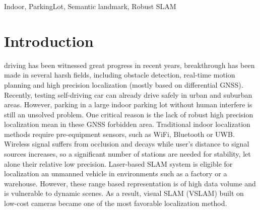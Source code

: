 \documentclass[journal]{IEEEtran}
\begin{document}
\begin{IEEEkeywords}
Indoor, ParkingLot, Semantic landmark, Robust SLAM
\end{IEEEkeywords}






%
\IEEEpeerreviewmaketitle



\section{Introduction}
% 
% 
% 
% 


 driving has been witnessed great progress in recent years, breakthrough has been made in several harsh fields, including obstacle detection, real-time motion planning and high precision localization (mostly based on differential GNSS).
Recently, testing self-driving car can already drive safely in urban and suburban areas\citep{DARPA WAYMO}. 
However, parking in a large indoor parking lot without human interfere is still an unsolved problem.
One critical reason is the lack of robust high precision localization mean in these GNSS forbidden area.
Traditional indoor localization methods require pre-equipment sensors, such as WiFi, Bluetooth or UWB. 
Wireless signal suffers from occlusion and decays while user’s distance to signal sources increases, so a significant number of stations are needed for stability, let alone their relative low precision\citep{WIFI bluetooth UWB}. 
Laser-based SLAM system is eligible for localization an unmanned vehicle in environments such as a factory or a warehouse\citep{REFERNCE}.
However, these range based representation is of high data volume and is vulnerable to dynamic scenes.
As a result, visual SLAM (VSLAM) built on low-cost cameras became one of the most favorable localization method.
\end{document}
